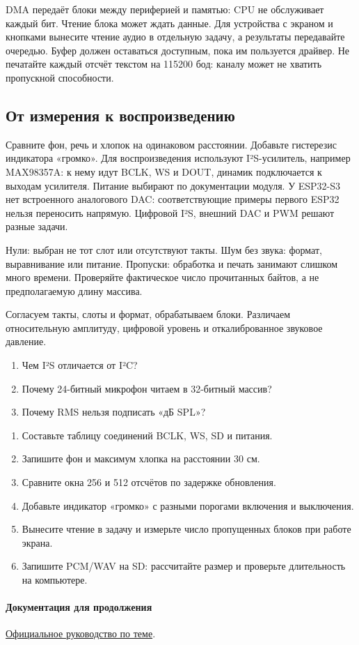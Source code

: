 DMA передаёт блоки между периферией и памятью: CPU не обслуживает каждый бит.
Чтение блока может ждать данные. Для устройства с экраном и кнопками вынесите чтение аудио
в отдельную задачу, а результаты передавайте очередью. Буфер должен оставаться доступным,
пока им пользуется драйвер. Не печатайте каждый отсчёт текстом на 115200 бод: каналу может
не хватить пропускной способности.

\subsection{От измерения к воспроизведению}
Сравните фон, речь и хлопок на одинаковом расстоянии. Добавьте гистерезис индикатора «громко».
Для воспроизведения используют I²S-усилитель, например MAX98357A: к нему идут BCLK, WS и DOUT,
динамик подключается к выходам усилителя. Питание выбирают по документации модуля.
У ESP32-S3 нет встроенного аналогового DAC: соответствующие примеры первого ESP32 нельзя
переносить напрямую. Цифровой I²S, внешний DAC и PWM решают разные задачи.

\begin{trouble}
Нули: выбран не тот слот или отсутствуют такты. Шум без звука: формат, выравнивание или питание.
Пропуски: обработка и печать занимают слишком много времени. Проверяйте фактическое число
прочитанных байтов, а не предполагаемую длину массива.
\end{trouble}
\begin{summary}
Согласуем такты, слоты и формат, обрабатываем блоки. Различаем относительную амплитуду,
цифровой уровень и откалиброванное звуковое давление.
\end{summary}

\begin{selfcheck}
\begin{enumerate}
\item Чем I²S отличается от I²C?
\item Почему 24-битный микрофон читаем в 32-битный массив?
\item Почему RMS нельзя подписать «дБ SPL»?
\end{enumerate}
\end{selfcheck}
\begin{tasks}
\begin{enumerate}
\item {} Составьте таблицу соединений BCLK, WS, SD и питания.
\item {} Запишите фон и максимум хлопка на расстоянии 30 см.
\item {} Сравните окна 256 и 512 отсчётов по задержке обновления.
\item {} Добавьте индикатор «громко» с разными порогами включения и выключения.
\item {} Вынесите чтение в задачу и измерьте число пропущенных блоков при работе экрана.
\item {} Запишите PCM/WAV на SD: рассчитайте размер и проверьте длительность на компьютере.
\end{enumerate}
\end{tasks}

\paragraph{Документация для продолжения}\href{https://docs.espressif.com/projects/arduino-esp32/en/latest/api/i2s.html}{Официальное руководство по теме}.
